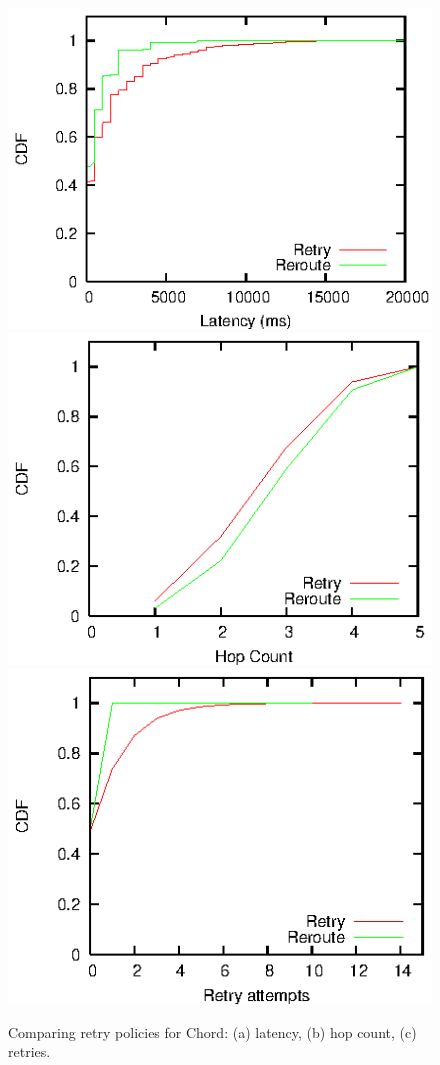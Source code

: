 \begin{figure}[ht]
\centerline{\includegraphics{transport/results/latencyCDF.eps}
\includegraphics{transport/results/hopCDF.eps}
\includegraphics{transport/results/retryCDF.eps}}
\caption{Comparing retry policies for Chord: (a) latency, (b) hop
  count, (c) retries.}
\label{fig:retry}
\end{figure}

